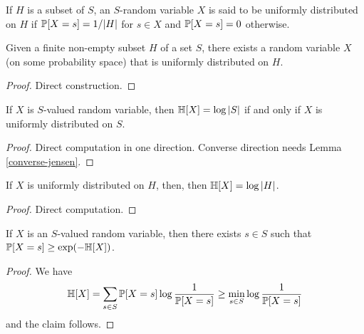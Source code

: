 \begin{definition}\label{uniform-def}
   If $H$ is a subset of $S$, an $S$-random variable $X$ is said to be uniformly distributed on $H$ if $\mathbb{P}[X = s] = 1/|H|$ for $s \in X$ and $\mathbb{P}[X=s] = 0$ otherwise.
\end{definition}

\begin{lemma}\label{unif-exist}
  \leanok
  Given a finite non-empty subset $H$ of a set $S$, there exists a random variable $X$ (on some probability space) that is uniformly distributed on $H$.
\end{lemma}

\begin{proof} Direct construction.
\end{proof}


\begin{lemma}\label{uniform-entropy}
  \leanok
  If $X$ is $S$-valued random variable, then $\mathbb{H}[X] = \log |S|$ if and only if $X$ is uniformly distributed on $S$.
\end{lemma}

\begin{proof}  Direct computation in one direction.  Converse direction needs Lemma \ref{converse-jensen}.
\end{proof}

\begin{lemma}\label{uniform-entropy-II}
  \leanok
  If $X$ is uniformly distributed on $H$, then, then $\mathbb{H}[X] = \log |H|$.
\end{lemma}

\begin{proof} Direct computation.
\end{proof}

\begin{lemma}\label{bound-conc}
  \leanok
  If $X$ is an $S$-valued random variable, then there exists $s \in S$ such that $\mathbb{P}[X=s] \geq \exp(-\mathbb{H}[X])$.
\end{lemma}

\begin{proof}
  We have
  $$ \mathbb{H}[X] = \sum_{s \in S} \mathbb{P}[X=s] \log \frac{1}{\mathbb{P}[X=s]} \geq \min_{s \in S} \log \frac{1}{\mathbb{P}[X=s]}$$
  and the claim follows.
\end{proof}


